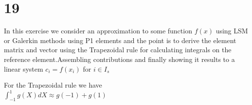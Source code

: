 \documentclass{article}
\begin{document}
\author{Shafa Aria}
\maketitle
\section{19}
In this exercise we consider an approximation to some function $f(x)$ using LSM or Galerkin methods using P1 elements and the point is to derive the element matrix and vector using the Trapezoidal rule for calculating integrals on the reference element.Assembling contributions and finally showing it results to a linear system $c_i = f(x_i)$ for $i \in I_s$


For the Trapezoidal rule we have\\
$\int_{-1}^{1}g(X)dX \approx g(-1) + g(1)$%
\end{document}
